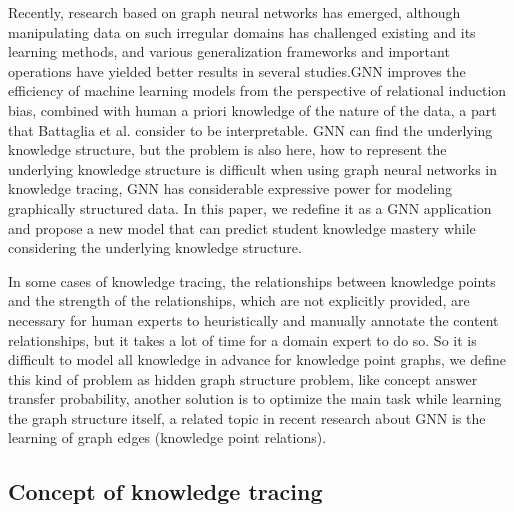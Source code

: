 \documentclass[11pt,en]{elegantpaper}
\begin{document}
Recently, research based on graph neural networks has emerged, although manipulating data on such irregular domains has challenged existing and its learning methods, and various generalization frameworks and important operations have yielded better results in several studies.GNN improves the efficiency of machine learning models from the perspective of relational induction bias, combined with human a priori knowledge of the nature of the data, a part that Battaglia et al. consider to be interpretable. GNN can find the underlying knowledge structure, but the problem is also here, how to represent the underlying knowledge structure is difficult when using graph neural networks in knowledge tracing, GNN has considerable expressive power for modeling graphically structured data. In this paper, we redefine it as a GNN application and propose a new model that can predict student knowledge mastery while considering the underlying knowledge structure.

In some cases of knowledge tracing, the relationships between knowledge points and the strength of the relationships, which are not explicitly provided, are necessary for human experts to heuristically and manually annotate the content relationships, but it takes a lot of time for a domain expert to do so. So it is difficult to model all knowledge in advance for knowledge point graphs, we define this kind of problem as hidden graph structure problem, like concept answer transfer probability, another solution is to optimize the main task while learning the graph structure itself, a related topic in recent research about GNN is the learning of graph edges (knowledge point relations).

\subsection{Concept of knowledge tracing}
\end{document}
